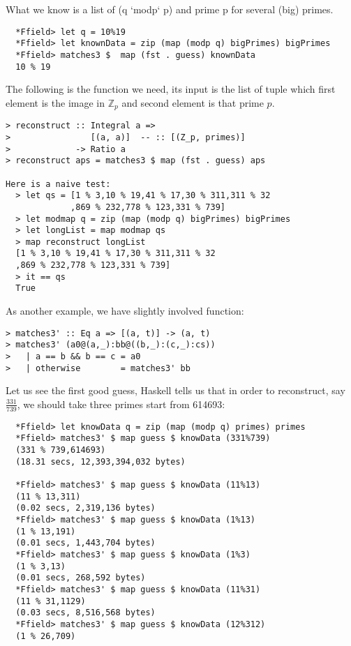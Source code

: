 \documentclass[11pt]{book}
\begin{document}
What we know is a list of (q `modp` p) and prime p for several (big) primes.
\begin{verbatim}
  *Ffield> let q = 10%19
  *Ffield> let knownData = zip (map (modp q) bigPrimes) bigPrimes  
  *Ffield> matches3 $  map (fst . guess) knownData 
  10 % 19
\end{verbatim}
The following is the function we need, its input is the list of tuple which first element is the image in $\mathbb{Z}_p$ and second element is that prime $p$.
\begin{verbatim}
> reconstruct :: Integral a =>
>                [(a, a)]  -- :: [(Z_p, primes)]
>             -> Ratio a
> reconstruct aps = matches3 $ map (fst . guess) aps

Here is a naive test:
  > let qs = [1 % 3,10 % 19,41 % 17,30 % 311,311 % 32
             ,869 % 232,778 % 123,331 % 739]
  > let modmap q = zip (map (modp q) bigPrimes) bigPrimes 
  > let longList = map modmap qs
  > map reconstruct longList 
  [1 % 3,10 % 19,41 % 17,30 % 311,311 % 32
  ,869 % 232,778 % 123,331 % 739]
  > it == qs
  True
\end{verbatim}

As another example, we have slightly involved function:
\begin{verbatim}
> matches3' :: Eq a => [(a, t)] -> (a, t)
> matches3' (a0@(a,_):bb@((b,_):(c,_):cs))
>   | a == b && b == c = a0
>   | otherwise        = matches3' bb
\end{verbatim}
Let us see the first good guess, Haskell tells us that in order to reconstruct, say $\frac{331}{739}$, we should take three primes start from 614693:
\begin{verbatim}
  *Ffield> let knowData q = zip (map (modp q) primes) primes
  *Ffield> matches3' $ map guess $ knowData (331%739)
  (331 % 739,614693)
  (18.31 secs, 12,393,394,032 bytes)
  
  *Ffield> matches3' $ map guess $ knowData (11%13)
  (11 % 13,311)
  (0.02 secs, 2,319,136 bytes)
  *Ffield> matches3' $ map guess $ knowData (1%13)
  (1 % 13,191)
  (0.01 secs, 1,443,704 bytes)
  *Ffield> matches3' $ map guess $ knowData (1%3)
  (1 % 3,13)
  (0.01 secs, 268,592 bytes)
  *Ffield> matches3' $ map guess $ knowData (11%31)
  (11 % 31,1129)
  (0.03 secs, 8,516,568 bytes)
  *Ffield> matches3' $ map guess $ knowData (12%312)
  (1 % 26,709)
\end{verbatim}
\end{document}
